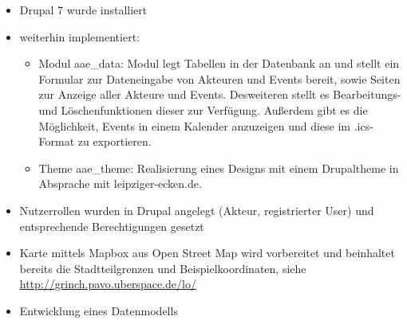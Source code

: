 \documentclass{swp}
\begin{document}
\\\\\\\\\\

\begin{itemize} 
\item Drupal 7 wurde installiert
\item weiterhin implementiert:
\begin{itemize} 
\item Modul \glqq aae\_{}data\grqq{}: Modul legt Tabellen in der Datenbank an und stellt ein Formular zur Dateneingabe von Akteuren und Events bereit, sowie Seiten zur Anzeige aller Akteure und Events. Desweiteren stellt es Bearbeitungs- und L\"oschenfunktionen dieser zur Verf\"ugung. Au{\ss}erdem gibt es die M\"oglichkeit, Events in einem Kalender anzuzeigen und diese im .ics-Format zu exportieren.
\item Theme \glqq aae\_{}theme\grqq{}: Realisierung eines Designs mit einem Drupaltheme in Absprache mit leipziger-ecken.de.
\end{itemize}
\item Nutzerrollen wurden in Drupal angelegt (Akteur, registrierter User) und entsprechende Berechtigungen gesetzt
\item Karte mittels Mapbox aus Open Street Map wird vorbereitet und beinhaltet bereits die Stadtteilgrenzen und Beispielkoordinaten, siehe \url{http://grinch.pavo.uberspace.de/lo/}
\item Entwicklung eines Datenmodells\\\\
\end{itemize}
\end{document}
